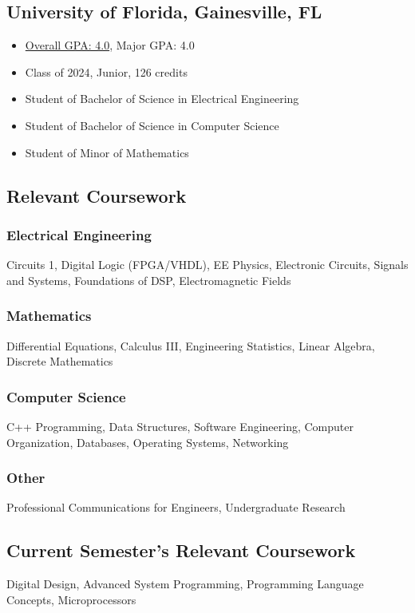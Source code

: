 \documentclass{article}
\newcommand\halftextbox[1]{%
  \parbox[t]{.475\textwidth}{#1}%
}
\newcommand\spacetextbox[1]{%
  \parbox{.05\textwidth}{#1}%
}
\newenvironment{CustomItemize}
{ \begin{itemize}[leftmargin=1em]
    \setlength{\itemsep}{0pt}
    \setlength{\parskip}{0pt}
    \setlength{\parindent}{0pt}
    \setlength{\parsep}{0pt}     }
{ \end{itemize}                  }
\begin{document}
\noindent
\halftextbox{
\begin{raggedright}
\subsection{University of Florida,  Gainesville, FL}
\begin{CustomItemize}
\item \underline{Overall GPA: 4.0}, Major GPA: 4.0
\item Class of 2024, Junior, 126 credits
\item Student of Bachelor of Science in Electrical Engineering
\item Student of Bachelor of Science in Computer Science
\item Student of Minor of Mathematics
\end{CustomItemize}

\subsection{Relevant Coursework}
\subsubsection{Electrical Engineering}
Circuits 1,
Digital Logic (FPGA/VHDL),
EE Physics,
Electronic Circuits,
Signals and Systems,
Foundations of DSP,
Electromagnetic Fields
\end{raggedright}
}
\spacetextbox{\hfil\hfil}
\halftextbox{
\begin{raggedright}
\subsubsection{Mathematics}
Differential Equations, 
Calculus III,
Engineering Statistics, 
Linear Algebra,
Discrete Mathematics

\subsubsection{Computer Science}
C++ Programming,
Data Structures,
Software Engineering,
Computer Organization,
Databases,
Operating Systems,
Networking

\subsubsection{Other}
Professional Communications for Engineers,
Undergraduate Research

\subsection{Current Semester's Relevant Coursework}
\end{raggedright}
Digital Design,
Advanced System Programming,
Programming Language Concepts,
Microprocessors
}
\end{document}

